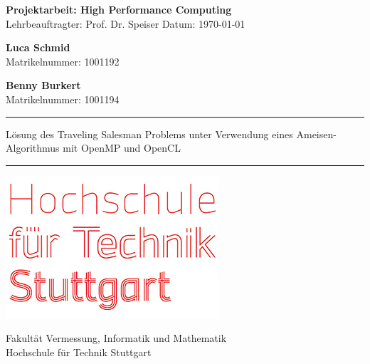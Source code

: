 \begin{titlepage}
    \begin{center}
        \vspace*{1cm}

        \textbf{Projektarbeit: High Performance Computing}\\
        Lehrbeauftragter: Prof. Dr. Speiser
        Datum: \today

        \vspace{2cm}

        \textbf{Luca Schmid} \\
        Matrikelnummer: 1001192

        \textbf{Benny Burkert} \\
        Matrikelnummer: 1001194
        
        \vspace{4cm}
        \rule[0.3cm]{\textwidth}{0.4pt}
        Lösung des Traveling Salesman Problems unter Verwendung eines Ameisen-Algorithmus mit OpenMP und OpenCL
        \rule{\textwidth}{0.4pt}
        \vspace{2.5cm}

        \includegraphics[scale=0.5]{images/hft-logo.jpg}
        
        \vspace{0.5cm}

        Fakultät Vermessung, Informatik und Mathematik\\
        Hochschule für Technik Stuttgart\\

    \end{center}   
\end{titlepage}